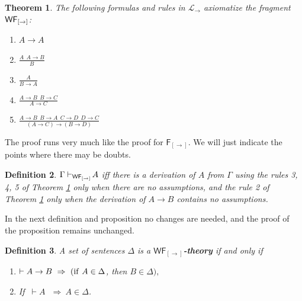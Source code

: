 \documentclass[12pt]{article}
\newtheorem{thm}{Theorem}[section]
\newtheorem{dfn}[thm]{Definition}
\begin{document}
\begin{thm}\label{wf}
The following formulas and rules in $ \mathcal{L} _{\rightarrow} $ axiomatize the fragment $ {\sf WF_{[\rightarrow]}} $:
\begin{enumerate}
\item $  A\rightarrow A$

\item $  \frac{A ~~A\rightarrow B}{B}$

\item $   \frac{A}{B\rightarrow A}$

\item $  \frac{A\rightarrow B~~B\rightarrow C}{A\rightarrow C}$

\item $ \frac{A\rightarrow B~~B \rightarrow A~~C\rightarrow D~~D\rightarrow C}{(A\rightarrow C)\rightarrow (B\rightarrow D)} $

\end{enumerate}
\end{thm}

The proof runs very much like the proof for $\mathsf{F_{[\rightarrow]}}$. We will just indicate the points where there may be doubts.

 \begin{dfn}\label{wf1}
$\Gamma\vdash_{{\sf WF_{[\rightarrow]}} }\! A$ iff there is a derivation of $A$ from $\Gamma$ using the rules 3, 4, 5 of Theorem \ref{wf} only when there are no assumptions, and the rule 2 of Theorem \ref{wf} only when the derivation of $A\to B$ contains no assumptions.
\end{dfn}  

In the next definition and proposition no changes are needed, and the proof of the proposition remains unchanged.
\begin{dfn}
A set of sentences $ \Delta$ is a \textbf{$\mathsf{WF_{[ \rightarrow ]}}$-theory} if and only if
\begin{enumerate}
\item  $ \vdash A\rightarrow B ~\Rightarrow~( {\rm if} ~ A \in \Delta$, then  $ B \in \Delta), $

\item  If  $ ~\vdash A~~~\Rightarrow~A \in \Delta $.
\end{enumerate}
 \end{dfn}
\end{document}
